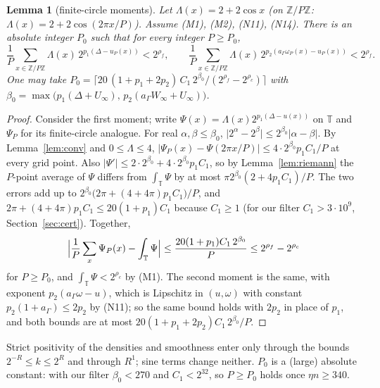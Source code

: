 \documentclass[11pt]{article}
\newtheorem{lemma}{Lemma}[section]
\theoremstyle{definition}
\newcommand{\Z}{\mathbb Z}
\newcommand{\Tc}{\mathbb T}
\newcommand{\abs}[1]{\lvert #1\rvert}
\begin{document}
\begin{lemma}[finite-circle moments]\label{lem:B1}
Let $\Lambda(x)=2+2\cos x$ (on $\Z/P\Z$: $\Lambda(x)=2+2\cos(2\pi x/P)$). Assume \textup{(M1)}, \textup{(M2)},
\textup{(N11)}, \textup{(N14)}. There is an absolute integer $P_0$ such that for every integer $P\ge P_0$,
\begin{equation}\label{eq:finmom}
 \frac1P\sum_{x\in\Z/P\Z}\Lambda(x)\,2^{p_1(\Delta-u_P(x))}<2^{\rho_f},\qquad
 \frac1P\sum_{x\in\Z/P\Z}\Lambda(x)\,2^{p_2(a_\Gamma\omega_P(x)-u_P(x))}<2^{\rho_f}.
\end{equation}
One may take
$P_0=\bigl\lceil 20\,(1+p_1+2p_2)\,C_1\,2^{\beta_0}/(2^{\rho_f}-2^{\rho_c})\bigr\rceil$ with
$\beta_0=\max\bigl(p_1(\Delta+U_\infty),\,p_2(a_\Gamma W_\infty+U_\infty)\bigr)$.
\end{lemma}
\begin{proof}
Consider the first moment; write $\Psi(x)=\Lambda(x)2^{p_1(\Delta-u(x))}$ on $\Tc$ and $\Psi_P$ for its finite-circle
analogue. For real $\alpha,\beta\le\beta_0$, $\abs{2^\alpha-2^\beta}\le2^{\beta_0}\abs{\alpha-\beta}$. By
Lemma~\ref{lem:conv} and $0\le\Lambda\le4$, $\abs{\Psi_P(x)-\Psi(2\pi x/P)}\le4\cdot2^{\beta_0}p_1C_1/P$ at every grid
point. Also $\abs{\Psi'}\le2\cdot2^{\beta_0}+4\cdot2^{\beta_0}p_1C_1$, so by Lemma~\ref{lem:riemann} the $P$-point
average of $\Psi$ differs from $\int_\Tc\Psi$ by at most $\pi2^{\beta_0}(2+4p_1C_1)/P$. The two errors add up to
$2^{\beta_0}\bigl(2\pi+(4+4\pi)p_1C_1\bigr)/P$, and $2\pi+(4+4\pi)p_1C_1\le20(1+p_1)C_1$ because $C_1\ge1$ (for our
filter $C_1>3\cdot10^9$, Section~\ref{sec:cert}). Together,
\[
 \Bigl\lvert\frac1P\sum_x\Psi_P(x)-\int_\Tc\Psi\Bigr\rvert\le\frac{20(1+p_1)C_1\,2^{\beta_0}}{P}\le2^{\rho_f}-2^{\rho_c}
\]
for $P\ge P_0$, and $\int_\Tc\Psi<2^{\rho_c}$ by \textup{(M1)}. The second moment is the same, with exponent
$p_2(a_\Gamma\omega-u)$, which is Lipschitz in $(u,\omega)$ with constant $p_2(1+a_\Gamma)\le2p_2$ by
\textup{(N11)}; so the same bound holds with $2p_2$ in place of $p_1$, and both bounds are at most
$20(1+p_1+2p_2)C_1\,2^{\beta_0}/P$.
\end{proof}
Strict positivity of the densities and smoothness enter only through the bounds $2^{-R}\le k\le2^R$ and through
$R^1$; sine terms change neither. $P_0$ is a (large) absolute constant: with our filter $\beta_0<270$ and $C_1<2^{32}$, so
$P\ge P_0$ holds once $\eta n\ge340$.
\end{document}

